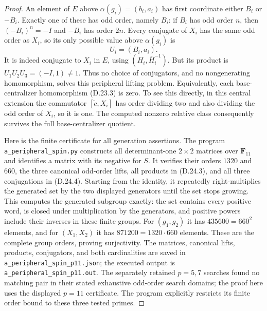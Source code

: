 \begin{proof}
An element of $E$ above $\alpha(g_i)=(b_i,a_i)$ has first
coordinate either $B_i$ or $-B_i$.  Exactly one of these has odd
order, namely $B_i$: if $B_i$ has odd order $n$, then
$(-B_i)^n=-I$ and $-B_i$ has order $2n$.  Every conjugate of
$X_i$ has the same odd order as $X_i$, so its only possible
value above $\alpha(g_i)$ is
\[
 U_i=(B_i,a_i).
 \tag{D.24.6}
\]
It is indeed conjugate to $X_i$ in $E$, using
$(H_i,\overline H_i^{-1})$.  But its product is
$U_1U_2U_3=(-I,1)\ne1$.  Thus no choice of conjugators, and no
nongenerating homomorphism, solves this peripheral lifting problem.
Equivalently, each base-centralizer homomorphism
\textup{(D.23.3)} is zero.  To see this directly, in this central
extension the commutator $[\widetilde c,X_i]$ has order dividing
two and also dividing the odd order of $X_i$, so it is one.
The computed nonzero relative class consequently survives the
full base-centralizer quotient.

Here is the finite certificate for all generation assertions.
The program \texttt{a\_peripheral\_spin.py} constructs all
determinant-one $2\times2$ matrices over $\mathbf F_{11}$ and
identifies a matrix with its negative for $S$.  It verifies their
orders $1320$ and $660$, the three canonical odd-order lifts,
all products in \textup{(D.24.3)}, and all three conjugations in
\textup{(D.24.4)}.  Starting from the identity, it repeatedly
right-multiplies the generated set by the two displayed generators
until the set stops growing.  This computes the generated subgroup
exactly: the set contains every positive word, is closed under
multiplication by the generators, and positive powers include
their inverses in these finite groups.  For $(g_1,g_2)$ it has
$435600=660^2$ elements, and for $(X_1,X_2)$ it has
$871200=1320\cdot660$ elements.  These are the complete group
orders, proving surjectivity.  The matrices, canonical lifts,
products, conjugators, and both cardinalities are saved in
\texttt{a\_peripheral\_spin\_p11.json}; the executed output is
\texttt{a\_peripheral\_spin\_p11.out}.  The separately retained
$p=5,7$ searches found no matching pair in their stated exhaustive
odd-order search domains; the proof here uses the displayed
$p=11$ certificate.  The program explicitly restricts its finite
order bound to these three tested primes.


\end{proof}
